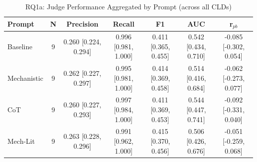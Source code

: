 \begin{table}[htbp]
\centering
\caption{RQ1a: Judge Performance Aggregated by Prompt (across all CLDs)}
\label{tab:rq1a_by_prompt}
\begin{tabular}{lcccccc}
\toprule
\textbf{Prompt} & \textbf{N} & \textbf{Precision} & \textbf{Recall} & \textbf{F1} & \textbf{AUC} & \textbf{r$_{pb}$} \\
\midrule
Baseline & 9 & 0.260 [0.224, 0.294] & 0.996 [0.981, 1.000] & 0.411 [0.365, 0.455] & 0.542 [0.434, 0.710] & -0.085 [-0.302, 0.054] \\
Mechanistic & 9 & 0.262 [0.227, 0.297] & 0.995 [0.981, 1.000] & 0.414 [0.369, 0.458] & 0.514 [0.416, 0.684] & -0.062 [-0.273, 0.077] \\
CoT & 9 & 0.260 [0.227, 0.293] & 0.997 [0.984, 1.000] & 0.411 [0.369, 0.453] & 0.544 [0.447, 0.741] & -0.092 [-0.331, 0.040] \\
Mech-Lit & 9 & 0.263 [0.228, 0.296] & 0.991 [0.962, 1.000] & 0.415 [0.370, 0.456] & 0.506 [0.426, 0.676] & -0.051 [-0.259, 0.068] \\
\bottomrule
\end{tabular}
\end{table}